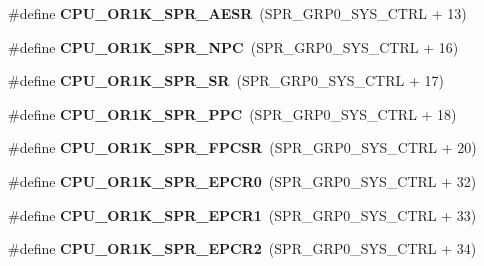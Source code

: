 \begin{DoxyCompactItemize}
\item 
\mbox{\label{or1k-utility_8h_a08ac041983be44b06165b65180cd6efb}} 
\#define {\bfseries C\+P\+U\+\_\+\+O\+R1\+K\+\_\+\+S\+P\+R\+\_\+\+A\+E\+SR}~(S\+P\+R\+\_\+\+G\+R\+P0\+\_\+\+S\+Y\+S\+\_\+\+C\+T\+RL + 13)
\item 
\mbox{\label{or1k-utility_8h_a9903fd6b71d7a298500884bcc14f2224}} 
\#define {\bfseries C\+P\+U\+\_\+\+O\+R1\+K\+\_\+\+S\+P\+R\+\_\+\+N\+PC}~(S\+P\+R\+\_\+\+G\+R\+P0\+\_\+\+S\+Y\+S\+\_\+\+C\+T\+RL + 16)
\item 
\mbox{\label{or1k-utility_8h_a4189ef59c2f899e3bd069978282869a6}} 
\#define {\bfseries C\+P\+U\+\_\+\+O\+R1\+K\+\_\+\+S\+P\+R\+\_\+\+SR}~(S\+P\+R\+\_\+\+G\+R\+P0\+\_\+\+S\+Y\+S\+\_\+\+C\+T\+RL + 17)
\item 
\mbox{\label{or1k-utility_8h_afc9bd6b55799fac39bcb86e71e63c387}} 
\#define {\bfseries C\+P\+U\+\_\+\+O\+R1\+K\+\_\+\+S\+P\+R\+\_\+\+P\+PC}~(S\+P\+R\+\_\+\+G\+R\+P0\+\_\+\+S\+Y\+S\+\_\+\+C\+T\+RL + 18)
\item 
\mbox{\label{or1k-utility_8h_a3fbe5d9a5d54d3be0b6ae5ab23d2adf1}} 
\#define {\bfseries C\+P\+U\+\_\+\+O\+R1\+K\+\_\+\+S\+P\+R\+\_\+\+F\+P\+C\+SR}~(S\+P\+R\+\_\+\+G\+R\+P0\+\_\+\+S\+Y\+S\+\_\+\+C\+T\+RL + 20)
\item 
\mbox{\label{or1k-utility_8h_ad94d372821c7ebcf95d8713f27a676a7}} 
\#define {\bfseries C\+P\+U\+\_\+\+O\+R1\+K\+\_\+\+S\+P\+R\+\_\+\+E\+P\+C\+R0}~(S\+P\+R\+\_\+\+G\+R\+P0\+\_\+\+S\+Y\+S\+\_\+\+C\+T\+RL + 32)
\item 
\mbox{\label{or1k-utility_8h_abef27242ac09b62d1ebdc9026c09a8db}} 
\#define {\bfseries C\+P\+U\+\_\+\+O\+R1\+K\+\_\+\+S\+P\+R\+\_\+\+E\+P\+C\+R1}~(S\+P\+R\+\_\+\+G\+R\+P0\+\_\+\+S\+Y\+S\+\_\+\+C\+T\+RL + 33)
\item 
\mbox{\label{or1k-utility_8h_a1f59b9bb47822947316e9f937f3f2302}} 
\#define {\bfseries C\+P\+U\+\_\+\+O\+R1\+K\+\_\+\+S\+P\+R\+\_\+\+E\+P\+C\+R2}~(S\+P\+R\+\_\+\+G\+R\+P0\+\_\+\+S\+Y\+S\+\_\+\+C\+T\+RL + 34)
\item 
\mbox{\label{or1k-utility_8h_a7d21a6856c41ac5f76943429b84c09aa}} 

\end{DoxyCompactItemize}
